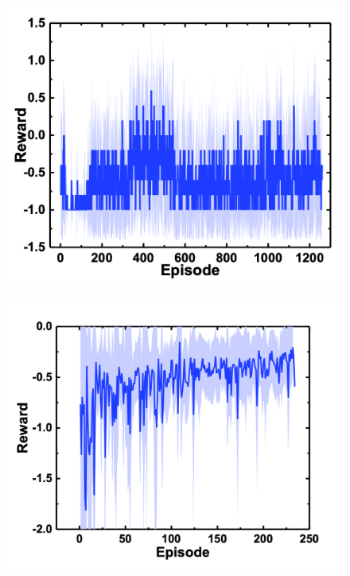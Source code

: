 \begin{figure}
    \centering
    \begin{minipage}{0.4\linewidth}
        \centering
        \includegraphics[width=0.9\linewidth]{figure/chapter3/rew=01_obs=面積重心_origin}
        \label{fig:報酬離散}
    \end{minipage}
    \hspace{5mm}
    \begin{minipage}{0.4\linewidth}
        \centering
        \includegraphics[width=0.9\linewidth]{figure/chapter3/QL_rew=distance_obs=posvec_origin}
\end{minipage}
\end{figure}
